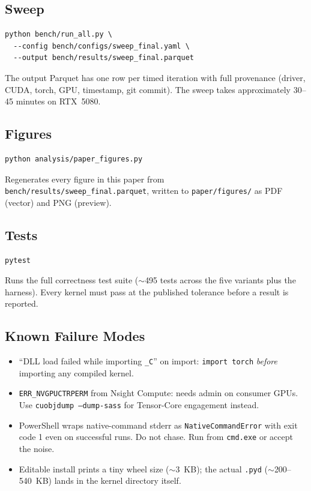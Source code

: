 \documentclass[conference]{IEEEtran}
\begin{document}
\subsection{Sweep}

\begin{lstlisting}
python bench/run_all.py \
  --config bench/configs/sweep_final.yaml \
  --output bench/results/sweep_final.parquet
\end{lstlisting}
The output Parquet has one row per timed iteration with full
provenance (driver, CUDA, torch, GPU, timestamp, git commit). The
sweep takes approximately 30--45 minutes on RTX~5080.

\subsection{Figures}

\begin{lstlisting}
python analysis/paper_figures.py
\end{lstlisting}
Regenerates every figure in this paper from
\texttt{bench/results/sweep\_final.parquet}, written to
\texttt{paper/figures/} as PDF (vector) and PNG (preview).

\subsection{Tests}

\begin{lstlisting}
pytest
\end{lstlisting}
Runs the full correctness test suite ($\sim$495 tests across the five
variants plus the harness). Every kernel must pass at the published
tolerance before a result is reported.

\subsection{Known Failure Modes}

\begin{itemize}
  \item ``DLL load failed while importing \texttt{\_C}'' on import:
        \texttt{import torch} \emph{before} importing any compiled
        kernel.
  \item \texttt{ERR\_NVGPUCTRPERM} from Nsight Compute: needs admin
        on consumer GPUs. Use \texttt{cuobjdump --dump-sass} for
        Tensor-Core engagement instead.
  \item PowerShell wraps native-command stderr as
        \texttt{NativeCommandError} with exit code 1 even on
        successful runs. Do not chase. Run from \texttt{cmd.exe} or
        accept the noise.
  \item Editable install prints a tiny wheel size ($\sim$3~KB);
        the actual \texttt{.pyd} ($\sim$200--540~KB) lands in the
        kernel directory itself.
\end{itemize}
\end{document}

